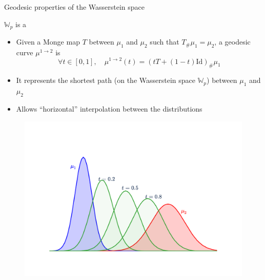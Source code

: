 \documentclass[pdf,aspectratio=169,10pt]{beamer}
\begin{document}
\begin{frame}{Geodesic properties of the Wasserstein space}
    \begin{minipage}{0.59\textwidth}
    $\mathbb{W}_p$ is a 
    \begin{itemize}
        \item Given a Monge map $T$ between $\mu_1$ and $\mu_2$ such that $T_{\#}\mu_1 = \mu_2$, a geodesic curve $\mu^{1\to 2}$ is
        \begin{equation*}
\forall t \in [0,1],\quad \mu^{1\to 2}(t) = {(t T + (1-t)\text{Id})}_{\#} \mu_1
        \end{equation*} 
        \item It represents the shortest path (on the Wasserstein space $\mathbb{W}_p$) between $\mu_1$ and $\mu_2$
        \item Allows ``horizontal'' interpolation between the distributions
    \end{itemize}
\end{minipage}
\hfill
\begin{minipage}{0.4\textwidth}
    \begin{figure}
        \centering
            \includegraphics[trim={2cm 2cm 2cm 2cm},clip, width=1\textwidth]{../img/geodesic_1d.pdf}
        \end{figure}
\end{minipage}

\vspace{2em}
        \small
{}
\end{frame}
\end{document}
